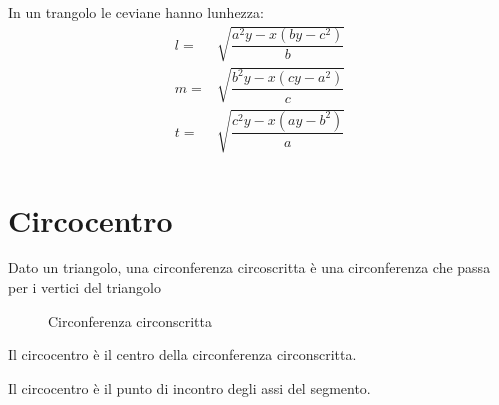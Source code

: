 \begin{cor}\label{cor:ceviana1}
In un trangolo le ceviane hanno lunhezza:
\begin{align*}
l=&\sqrt{\dfrac{a^2y-x(by-c^2)}{b}}\\
m=&\sqrt{\dfrac{b^2y-x(cy-a^2)}{c}}\\
t=&\sqrt{\dfrac{c^2y-x(ay-b^2)}{a}}\\
\end{align*}
\end{cor}
\section{Circocentro}\label{sec:circocentro}
\begin{defn}\label{defn:CircCirc1}
Dato un triangolo, una circonferenza circoscritta è una circonferenza che passa per i vertici del triangolo
\end{defn}
\begin{figure}
	\centering

	\caption{Circonferenza circonscritta}
	\label{fig:circumcerchio}
\end{figure}
\begin{defn}[Circocentro]\label{defn:Circocentro1}
Il circocentro è il centro della circonferenza circonscritta. 
\end{defn}
\begin{thm}\label{thm:CircoAsse1}
Il circocentro è il punto di incontro degli assi del segmento.
\end{thm}
